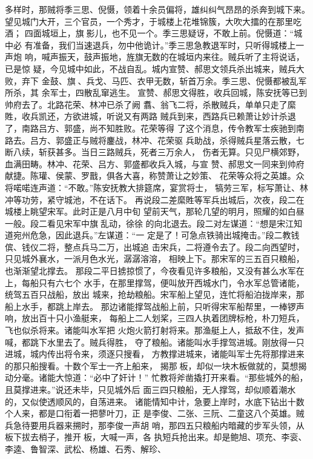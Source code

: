 多样时，那贼将季三思、倪慑，领着十余员偏将，雄纠纠气昂昂的杀奔到城下来。
望见城门大开，三个官员，一个秀才，于城楼上花堆锦簇，大吹大擂的在那里吃酒；
四面城垣上，旗影儿，也不见一个。季三思疑讶，不敢上前。倪慑道：“城中必
有准备，我们当速退兵，勿中他诡计。”季三思急教退军时，只听得城楼上一声炮
响，喊声振天，鼓声振地，旌旗无数的在城垣内来往。贼兵听了主将说话，已是惊
疑，今见城中如此，不战自乱。城内宣赞、郝思文领兵杀出城来，贼兵大败，弃下
金鼓、旗、兵戈、马匹、衣甲无数，斩首万余。季三思、倪慑都被乱军所杀，其
余军士，四散乱窜逃生。
宣赞、郝思文得胜，收兵回城，陈安抚等已到帅府去了。北路花荣、林冲已杀了阙
翥、翁飞二将，杀散贼兵，单单只走了縻貹，收兵凯还，方欲进城，听说又有两路
贼兵到来，西路兵已赖萧让妙计杀退了，南路吕方、郭盛，尚不知胜败。花荣等得
了这个消息，传令教军士疾驰到南路去。吕方、郭盛正与贼将鏖战，林冲、花荣驱
兵助战，杀得贼兵星落云散，七断八续，斩获甚多。当日三路贼兵，死者三万余人，
伤者无算。只见尸横郊野，血满田畴。林冲、花荣、吕方、郭盛都收兵入城，与宣
赞、郝思文一同来到帅府献捷。陈瓘、侯蒙、罗戬，俱各大喜，称赞萧让之妙策、
花荣等众将之英雄。众将喏喏连声道：“不敢。”陈安抚教大排筵席，宴赏将士，
犒劳三军，标写萧让、林冲等功劳，紧守城池，不在话下。
再说段二差縻貹等军兵出城后，次夜，段二在城楼上眺望宋军。此时正是八月中旬
望前天气，那轮几望的明月，照耀的如白昼一般。段二看见宋军中旗乱动，徐徐
的向北退去。段二对左谋道：“想是宋江知道宛州危急，因此退兵。”左谋道：“一
定是了！可急点铁骑出城掩击。”段二教钱傧、钱仪二将，整点兵马二万，出城追
击宋兵，二将遵令去了。段二向西望时，只见城外襄水，一派月色水光，潺潺溶溶，
相映上下。那宋军的三五百只粮船，也渐渐望北撑去。
那段二平日掳掠惯了，今夜看见许多粮船，又没有甚么水军在上，每船只有六七个
水手，在那里撑驾，便叫放开西城水门，令水军总管诸能，统驾五百只战船，放出
城来，抢劫粮船。宋军船上望见，连忙将船泊拢岸来，那船上水手，都跳上岸去。
那边诸能撑驾战船上前，只听得宋军船帮里，一棒锣声响，放出百十只小渔艇来，
每船上二人划桨，三四人执着团牌标枪，朴刀短兵，飞也似杀将来。诸能叫水军把
火炮火箭打射将来。那渔艇上人，抵敌不住，发声喊，都跳下水里去了。贼兵得胜，
夺了粮船。诸能叫水手撑驾进城。刚放得一只进城，城内传出将令来，须逐只搜看，
方教撑进城来，诸能叫军士先将那撑进来的那只船搜看。十数个军士一齐上船来，
揭那板，却似一块木板做就的，莫想揭动分毫。诸能大惊道：“必中了奸计！”
忙教将斧凿撬打开来看。“那些城外的船，且莫撑进来。”说还未毕，只见城外后
面三四只粮船，无人撑驾，却似顺着潮水的，又似使透顺风的，自荡进来。
诸能情知中计，急要上岸时，水底下钻出十数个人来，都是口衔着一把蓼叶刀，正
是李俊、二张、三阮、二童这八个英雄。贼兵急待要用兵器来搠时，那李俊一声胡
哨，那四五只粮船内暗藏的步军头领，从板下拔去梢子，推开板，大喊一声，各
执短兵抢出来。却是鲍旭、项充、李衮、李逵、鲁智深、武松、杨雄、石秀、解珍、
